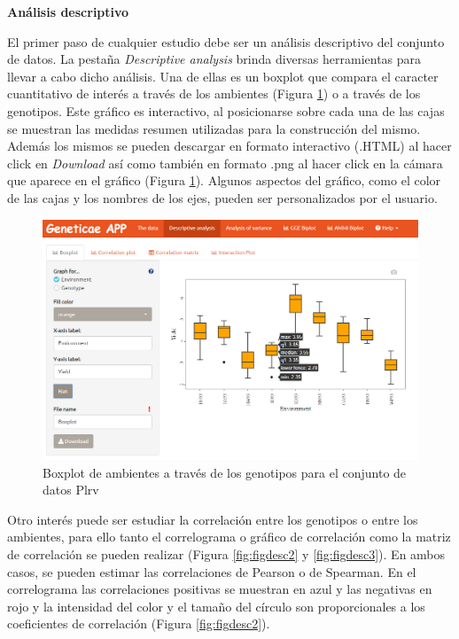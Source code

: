 \textbf{Análisis descriptivo}

El primer paso de cualquier estudio debe ser un análisis descriptivo del conjunto de datos. La pestaña \emph{Descriptive analysis} brinda diversas herramientas para llevar a cabo dicho análisis. Una de ellas es un boxplot que compara el caracter cuantitativo de interés a través de los ambientes (Figura \ref{fig:figdesc1}) o a través de los genotipos. Este gráfico es interactivo, al posicionarse sobre cada una de las cajas se muestran las medidas resumen utilizadas para la construcción del mismo. Además los mismos se pueden descargar en formato interactivo (.HTML) al hacer click en \emph{Download} así como también en formato .png al hacer click en la cámara que aparece en el gráfico (Figura \ref{fig:figdesc1}). Algunos aspectos del gráfico, como el color de las cajas y los nombres de los ejes, pueden ser personalizados por el usuario. 

\begin{figure}[H]
	\begin{center}
		\includegraphics[width=16cm]{./Graficos/Boxplot_environment.png}
	\end{center}
	\caption{Boxplot de ambientes a través de los genotipos para el conjunto de datos Plrv}
	\label{fig:figdesc1}
\end{figure}



Otro interés puede ser estudiar la correlación entre los genotipos o entre los ambientes, para ello tanto el correlograma o gráfico de correlación como la matriz de correlación se pueden realizar (Figura \ref{fig:figdesc2} y \ref{fig:figdesc3}). En ambos casos, se pueden estimar las correlaciones de Pearson o de Spearman. En el correlograma las correlaciones positivas se muestran en azul y las negativas en rojo y la intensidad del color y el tamaño del círculo son proporcionales a los coeficientes de correlación (Figura \ref{fig:figdesc2}). 


